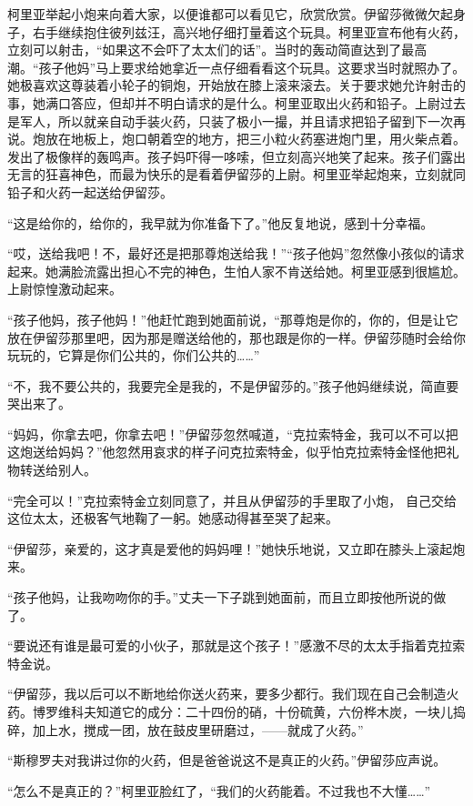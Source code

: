\par 柯里亚举起小炮来向着大家，以便谁都可以看见它，欣赏欣赏。伊留莎微微欠起身子，右手继续抱住彼列兹汪，高兴地仔细打量着这个玩具。柯里亚宣布他有火药，立刻可以射击，“如果这不会吓了太太们的话”。当时的轰动简直达到了最高潮。“孩子他妈”马上要求给她拿近一点仔细看看这个玩具。这要求当时就照办了。她极喜欢这尊装着小轮子的铜炮，开始放在膝上滚来滚去。关于要求她允许射击的事，她满口答应，但却并不明白请求的是什么。柯里亚取出火药和铅子。上尉过去是军人，所以就亲自动手装火药，只装了极小一撮，并且请求把铅子留到下一次再说。炮放在地板上，炮口朝着空的地方，把三小粒火药塞进炮门里，用火柴点着。发出了极像样的轰鸣声。孩子妈吓得一哆嗦，但立刻高兴地笑了起来。孩子们露出无言的狂喜神色，而最为快乐的是看着伊留莎的上尉。柯里亚举起炮来，立刻就同铅子和火药一起送给伊留莎。
\par “这是给你的，给你的，我早就为你准备下了。”他反复地说，感到十分幸福。
\par “哎，送给我吧！不，最好还是把那尊炮送给我！”“孩子他妈”忽然像小孩似的请求起来。她满脸流露出担心不完的神色，生怕人家不肯送给她。柯里亚感到很尴尬。上尉惊惶激动起来。
\par “孩子他妈，孩子他妈！”他赶忙跑到她面前说，“那尊炮是你的，你的，但是让它放在伊留莎那里吧，因为那是赠送给他的，那也跟是你的一样。伊留莎随时会给你玩玩的，它算是你们公共的，你们公共的……”
\par “不，我不要公共的，我要完全是我的，不是伊留莎的。”孩子他妈继续说，简直要哭出来了。
\par “妈妈，你拿去吧，你拿去吧！”伊留莎忽然喊道，“克拉索特金，我可以不可以把这炮送给妈妈？”他忽然用哀求的样子问克拉索特金，似乎怕克拉索特金怪他把礼物转送给别人。
\par “完全可以！”克拉索特金立刻同意了，并且从伊留莎的手里取了小炮， 自己交给这位太太，还极客气地鞠了一躬。她感动得甚至哭了起来。
\par “伊留莎，亲爱的，这才真是爱他的妈妈哩！”她快乐地说，又立即在膝头上滚起炮来。
\par “孩子他妈，让我吻吻你的手。”丈夫一下子跳到她面前，而且立即按他所说的做了。
\par “要说还有谁是最可爱的小伙子，那就是这个孩子！”感激不尽的太太手指着克拉索特金说。
\par “伊留莎，我以后可以不断地给你送火药来，要多少都行。我们现在自己会制造火药。博罗维科夫知道它的成分：二十四份的硝，十份硫黄，六份桦木炭，一块儿捣碎，加上水，搅成一团，放在鼓皮里研磨过，——就成了火药。”
\par “斯穆罗夫对我讲过你的火药，但是爸爸说这不是真正的火药。”伊留莎应声说。
\par “怎么不是真正的？”柯里亚脸红了，“我们的火药能着。不过我也不大懂……”
